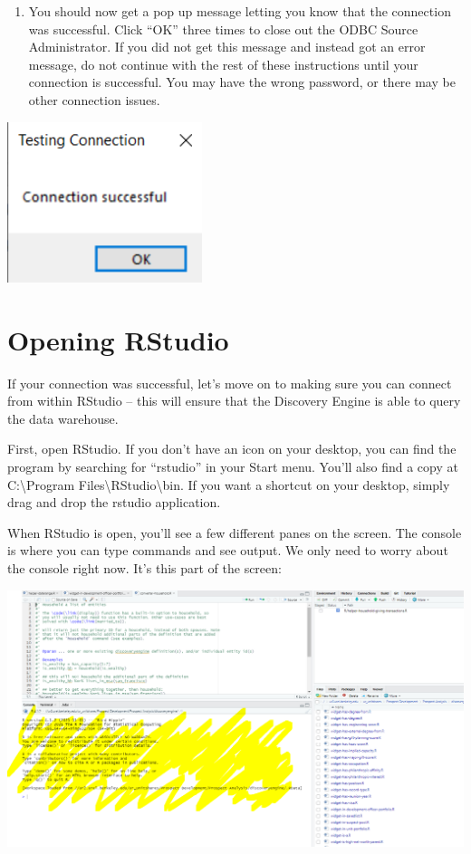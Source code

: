 \documentclass[]{book}
\providecommand{\tightlist}{%
  \setlength{\itemsep}{0pt}\setlength{\parskip}{0pt}}
\begin{document}
\begin{enumerate}
\def\labelenumi{\arabic{enumi})}
\setcounter{enumi}{5}
\tightlist
\item
  You should now get a pop up message letting you know that the connection was successful. Click ``OK'' three times to close out the ODBC Source Administrator. If you did not get this message and instead got an error message, do not continue with the rest of these instructions until your connection is successful. You may have the wrong password, or there may be other connection issues.
\end{enumerate}

\includegraphics[width=2.24in]{images/successful}

\hypertarget{opening-rstudio}{%
\section{Opening RStudio}\label{opening-rstudio}}

If your connection was successful, let's move on to making sure you can connect from within RStudio -- this will ensure that the Discovery Engine is able to query the data warehouse.

First, open RStudio. If you don't have an icon on your desktop, you can find the program by searching for ``rstudio'' in your Start menu. You'll also find a copy at C:\textbackslash Program Files\textbackslash RStudio\textbackslash bin. If you want a shortcut on your desktop, simply drag and drop the rstudio application.

When RStudio is open, you'll see a few different panes on the screen. The console is where you can type commands and see output. We only need to worry about the console right now. It's this part of the screen:

\includegraphics[width=21.33in]{images/console}
\end{document}
